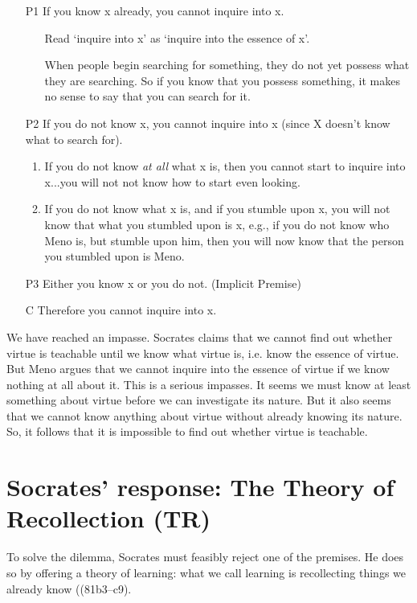 \documentclass[10 pt]{article}
\begin{document}
\begin{enumerate}
\item[P1] If you know x already, you cannot inquire into x. 
\begin{enumerate}
\item[] Read `inquire into x' as `inquire into the essence of x'. 
\item[] When people begin searching for something, they do not yet possess what they are searching. So if you know that you possess something, it makes no sense to say that you can search for it.
\end{enumerate}
\item[P2] If you do not know x, you cannot inquire into x (since X doesn't know what to search for).
\begin{enumerate}
\item If you do not know \emph{at all} what x is, then you cannot start to inquire into x...you will not not know how to start even looking.
\item If you do not know what x is, and if you stumble upon x, you will not know that what you stumbled upon is x, e.g., if you do not know who Meno is, but stumble upon him, then you will now know that the person you stumbled upon is Meno. 
\end{enumerate}
\item[P3] Either you know x or you do not. (Implicit Premise) 
\item[C] Therefore you cannot inquire into x.
\end{enumerate}

We have reached an impasse.  Socrates claims that we cannot find out whether virtue is teachable until we know what virtue is, i.e. know the essence of virtue.  But Meno argues that we cannot inquire into the essence of virtue if we know nothing at all about it. This is a serious impasses. It seems we must know at least something about virtue before we can investigate its nature. But it also seems that we cannot know anything about virtue without already knowing its nature. So, it follows that it is impossible to find out whether virtue is teachable. 

\section*{Socrates' response: The Theory of Recollection (TR)}
To solve the dilemma, Socrates must feasibly reject one of the premises. He does so by offering a theory of learning: what we call learning is recollecting things we already know ((81b3--c9).
\end{document}
